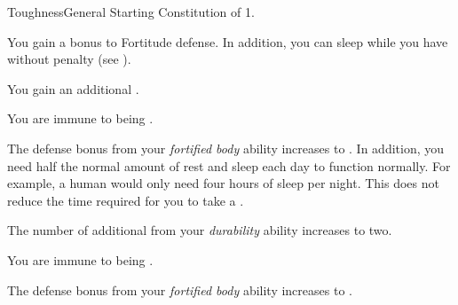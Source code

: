     \begin{feat}{Toughness}{General}
        \featpre Starting Constitution of 1.

         You gain a  bonus to Fortitude defense.
        In addition, you can sleep while you have  without penalty (see ).

         You gain an additional .

         You are immune to being .

         The defense bonus from your \textit{fortified body} ability increases to .
        In addition, you need half the normal amount of rest and sleep each day to function normally.
        For example, a human would only need four hours of sleep per night.
        This does not reduce the time required for you to take a .

         The number of additional  from your \textit{durability} ability increases to two.

         You are immune to being .

         The defense bonus from your \textit{fortified body} ability increases to .
    \end{feat}

